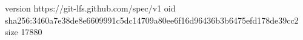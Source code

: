 version https://git-lfs.github.com/spec/v1
oid sha256:3460a7e38de8e6609991c5dc14709a80ee6f16d96436b3b6475efd178de39cc2
size 17880
